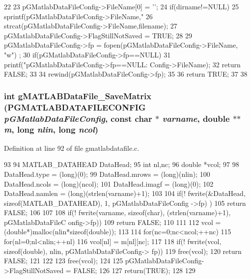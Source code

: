 \begin{DoxyCode}
22 {
23         pGMatlabDataFileConfig->FileName[0] = '\0';
24         if(dirname!=NULL)
25                 sprintf(pGMatlabDataFileConfig->FileName,"%
26         strcat(pGMatlabDataFileConfig->FileName,filename);
27         pGMatlabDataFileConfig->FlagStillNotSaved = TRUE;
28 
29         pGMatlabDataFileConfig->fp = fopen(pGMatlabDataFileConfig->FileName, "w")
      ;
30         if(pGMatlabDataFileConfig->fp==NULL){
31                 printf("\n pGMatlabDataFileConfig->fp==NULL: %
      Config->FileName);
32                 return FALSE;
33         }
34         rewind(pGMatlabDataFileConfig->fp);
35 
36         return TRUE;
37 
38 }
\end{DoxyCode}
\subsubsection[{gMATLABDataFile\_\-SaveMatrix}]{\setlength{\rightskip}{0pt plus 5cm}int gMATLABDataFile\_\-SaveMatrix ({\bf PGMATLABDATAFILECONFIG} {\em pGMatlabDataFileConfig}, \/  const char $\ast$ {\em varname}, \/  double $\ast$$\ast$ {\em m}, \/  long {\em nlin}, \/  long {\em ncol})}\label{gmatlabdatafile_8h_a4c928bd4ef71adea00c53f157ab00bea}


Definition at line 92 of file gmatlabdatafile.c.


\begin{DoxyCode}
93 {
94         MATLAB_DATAHEAD DataHead;
95         int nl,nc;
96         double *vcol;
97 
98         DataHead.type  = (long)(0);             
99         DataHead.mrows = (long)(nlin);  
100         DataHead.ncols = (long)(ncol);
101         DataHead.imagf = (long)(0);
102         DataHead.namlen = (long)(strlen(varname)+1);
103 
104         if(! fwrite(&DataHead, sizeof(MATLAB_DATAHEAD), 1, pGMatlabDataFileConfig
      ->fp) ){
105                 return FALSE;
106         }
107 
108         if(! fwrite(varname, sizeof(char), (strlen(varname)+1), pGMatlabDataFileC
      onfig->fp)){
109                 return FALSE;
110         }
111 
112         vcol = (double*)malloc(nlin*sizeof(double));
113 
114         for(nc=0;nc<ncol;++nc){
115                 for(nl=0;nl<nlin;++nl){
116                         vcol[nl] = m[nl][nc];
117                 }
118                 if(! fwrite(vcol, sizeof(double), nlin, pGMatlabDataFileConfig->
      fp)){
119                         free(vcol);
120                         return FALSE;
121                 }
122         }
123         free(vcol);
124 
125         pGMatlabDataFileConfig->FlagStillNotSaved = FALSE;
126 
127         return(TRUE);
128 
129 }
\end{DoxyCode}
